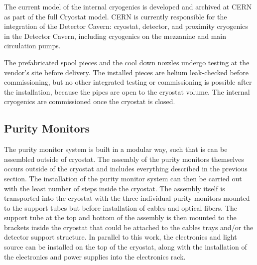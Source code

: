 The current \threed model of the internal cryogenics is developed and archived at CERN as part of the full Cryostat model. CERN is currently responsible for the integration of the Detector Cavern: cryostat, detector, and proximity cryogenics in the Detector Cavern, including cryogenics on the mezzanine and main \lar circulation pumps.

The prefabricated spool pieces and the cool down nozzles undergo testing at the vendor's site before delivery. The installed pieces are helium leak-checked before commissioning, but no other integrated testing or commissioning is possible after the installation, because the pipes are open to the cryostat volume. The internal cryogenics are commissioned once the cryostat is closed.


\subsection{Purity Monitors}
\label{sec:fdgen-slow-cryo-instal-pm}

The purity monitor system is built in a modular way, such that is can be assembled outside of  cryostat.  The assembly of the purity monitors themselves occurs outside of the cryostat and includes everything described in the previous section.  The installation of the purity monitor system can then be carried out with the least number of steps inside the cryostat.  The assembly itself is transported into the cryostat with the three individual purity monitors mounted to the support tubes but before installation of  cables and optical fibers. The support tube at the top and bottom of the assembly is then mounted to the brackets inside the cryostat that could be attached to the cables trays and/or the detector support structure.  In parallel to this work, the  electronics and light source can be installed on the top of the cryostat, along with the installation of the electronics and power supplies into the electronics rack.  

